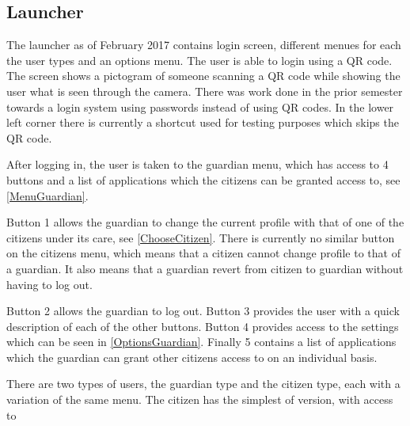 \subsection{Launcher}

The launcher as of February 2017 contains login screen, different menues for
each the user types and an options menu. The user is able to login using a QR
code. The screen shows a pictogram of someone scanning a QR code while showing
the user what is seen through the camera. There was work done in the prior
semester towards a login system using passwords instead of using QR
codes. In the lower left corner there is currently a shortcut used for
testing purposes which skips the QR code. 


After logging in, the user is taken to the guardian menu, which has access to 4
buttons and a list of applications which the citizens can be granted access to,
see \autoref{MenuGuardian}.


Button 1 allows the guardian to change the current profile with that of one of
the citizens under its care, see \autoref{ChooseCitizen}. There is currently no
similar button on the citizens menu, which means that a citizen cannot change
profile to that of a guardian. It also means that a guardian revert from
citizen to guardian without having to log out.


Button 2 allows the guardian to log out. Button 3 provides
the user with a quick description of each of the other buttons. Button 4
provides access to the settings which can be seen in \autoref{OptionsGuardian}.
Finally 5 contains a list of applications which the guardian can grant other
citizens access to on an individual basis.




There are two types of users, the guardian type and the citizen type, each with
a variation of the same menu. The citizen has the simplest of version, with
access to 






